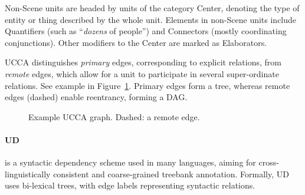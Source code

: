 \documentclass[11pt,a4paper,table]{article}
\begin{document}
  Non-Scene units are headed by units of the category Center,
  denoting the type of entity or thing described by the whole unit.
  Elements in non-Scene units include Quantifiers (such as ``{\it dozens} of people'') and
  Connectors (mostly coordinating conjunctions).
  Other modifiers to the Center are marked as Elaborators.
  
  UCCA distinguishes \textit{primary} edges, corresponding 
  to explicit relations, from \textit{remote} edges,
  which allow for a unit to participate
  in several super-ordinate relations.
  See example in Figure~\ref{fig:example_ucca}.
  Primary edges form a tree, whereas remote edges (dashed) enable reentrancy, forming a DAG.

\begin{figure}[th]
  \centering
\caption{Example UCCA graph. Dashed: a remote edge.\label{fig:example_ucca}}
\end{figure}



\paragraph{UD}\label{sec:ud}
is a syntactic dependency scheme used in many languages,
aiming for cross-linguistically consistent and coarse-grained treebank
annotation. Formally, UD uses bi-lexical trees, with edge labels 
representing syntactic relations.
\end{document}
